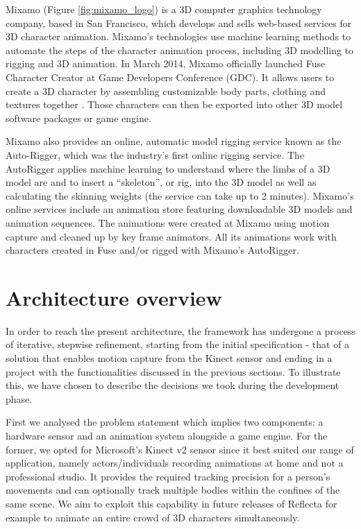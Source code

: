 \documentclass[a4paper, 12pt]{amsart}
\begin{document}
Mixamo (Figure \ref{fig:mixamo_logo}) is a 3D computer graphics technology company, based in San Francisco, which develops and sells web-based services for 3D character animation. Mixamo's technologies use machine learning methods to automate the steps of the character animation process, including 3D modelling to rigging and 3D animation. In March 2014, Mixamo officially launched Fuse Character Creator at Game Developers Conference (GDC). It allows users to create a 3D character by assembling customizable body parts, clothing and textures together \cite{bib_mixamo}. Those characters can then be exported into other 3D model software packages or game engine.

Mixamo also provides an online, automatic model rigging service known as the Auto-Rigger, which was the industry's first online rigging service. The AutoRigger applies machine learning to understand where the limbs of a 3D model are and to insert a ``skeleton'', or rig, into the 3D model as well as calculating the skinning weights (the service can take up to 2 minutes). Mixamo's online services include an animation store featuring downloadable 3D models and animation sequences. The animations were created at Mixamo using motion capture and cleaned up by key frame animators. All its animations work with characters created in Fuse and/or rigged with Mixamo's AutoRigger.

\clearpage

\section{Architecture overview}

In order to reach the present architecture, the framework has undergone a process of iterative, stepwise refinement, starting from the initial specification - that of a solution that enables motion capture from the Kinect sensor and ending in a project with the functionalities discussed in the previous sections. To illustrate this, we have chosen to describe the decisions we took during the development phase.

First we analysed the problem statement which implies two components: a hardware sensor and an animation system alongside a game engine. For the former, we opted for Microsoft's Kinect v2 sensor since it best suited our range of application, namely actors/individuals recording animations at home and not a professional studio. It provides the required tracking precision for a person's movements and can optionally track multiple bodies within the confines of the same scene. We aim to exploit this capability in future releases of Reflecta for example to animate an entire crowd of 3D characters simultaneously.
\end{document}
